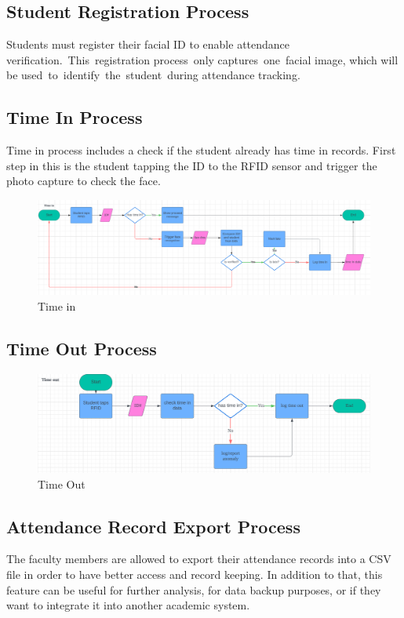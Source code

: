 \subsection{Student Registration Process}
	Students must register their facial ID to enable attendance verification. This registration process only captures one facial image, which will be used to identify the student during attendance tracking. 

\subsection{Time In Process}
	Time in process includes a check if the student already has time in records. First step in this is the student tapping the ID to the RFID sensor and trigger the photo capture to check the face.
	\begin{figure}[h] %
		\centering
		\includegraphics[width=1.0\textwidth]{figures/chapter4/timein.png} %
		\caption{Time in}
		\label{fig:timein}
	\end{figure}
	
\clearpage
\subsection{Time Out Process}
\begin{figure}[h] %
	\centering
	\includegraphics[width=1.0\textwidth]{figures/chapter4/timeout.png} %
	\caption{Time Out}
	\label{fig:timeout}
\end{figure}

\subsection{Attendance Record Export Process}
	The faculty members are allowed to export their attendance records into a CSV file in order to have better access and record keeping. In addition to that, this feature can be useful for further analysis, for data backup purposes, or if they want to integrate it into another academic system.
	
